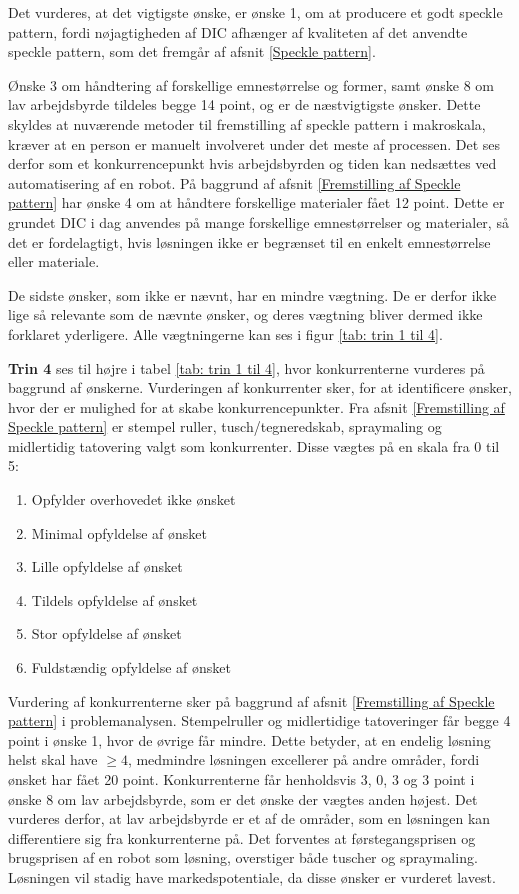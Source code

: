 Det vurderes, at det vigtigste ønske, er ønske 1, om at producere et godt speckle pattern, fordi nøjagtigheden af DIC afhænger af kvaliteten af det anvendte speckle pattern, som det fremgår af afsnit \ref{Speckle pattern}. 

Ønske 3 om håndtering af forskellige emnestørrelse og former, samt ønske 8 om lav arbejdsbyrde tildeles begge 14 point, og er de næstvigtigste ønsker. Dette skyldes at nuværende metoder til fremstilling af speckle pattern i makroskala, kræver at en person er manuelt involveret under det meste af processen. Det ses derfor som et konkurrencepunkt hvis arbejdsbyrden og tiden kan nedsættes ved automatisering af en robot. På baggrund af afsnit \ref{Fremstilling af Speckle pattern} har ønske 4 om at håndtere forskellige materialer fået 12 point. Dette er grundet DIC i dag anvendes på mange forskellige emnestørrelser og materialer, så det er fordelagtigt, hvis løsningen ikke er begrænset til en enkelt emnestørrelse eller materiale. 

De sidste ønsker, som ikke er nævnt, har en mindre vægtning. De er derfor ikke lige så relevante som de nævnte ønsker, og deres vægtning bliver dermed ikke forklaret yderligere. Alle vægtningerne kan ses i figur \ref{tab: trin 1 til 4}.


\textbf{Trin 4} ses til højre i tabel \ref{tab: trin 1 til 4}, hvor konkurrenterne vurderes på baggrund af ønskerne. Vurderingen af konkurrenter sker, for at identificere ønsker, hvor der er mulighed for at skabe konkurrencepunkter. Fra afsnit \ref{Fremstilling af Speckle pattern} er stempel ruller, tusch/tegneredskab, spraymaling og midlertidig tatovering valgt som konkurrenter. Disse vægtes på en skala fra 0 til 5: %


\newcommand{\myhash}{\raisebox{\depth}{\#}}
\begin{enumerate}[font=\bfseries]\addtocounter{enumi}{-1}
    \item Opfylder overhovedet ikke ønsket 
    \item Minimal opfyldelse af ønsket 
    \item Lille opfyldelse af ønsket 
    \item Tildels opfyldelse af ønsket 
    \item Stor opfyldelse af ønsket 
    \item Fuldstændig opfyldelse af ønsket 
\end{enumerate}


Vurdering af konkurrenterne sker på baggrund af afsnit \ref{Fremstilling af Speckle pattern} i problemanalysen. Stempelruller og midlertidige tatoveringer får begge 4 point i ønske 1, hvor de øvrige får mindre. Dette betyder, at en endelig løsning helst skal have $\geq 4$, medmindre løsningen excellerer på andre områder, fordi ønsket har fået 20 point. Konkurrenterne får henholdsvis 3, 0, 3 og 3 point i ønske 8 om lav arbejdsbyrde, som er det ønske der vægtes anden højest. Det vurderes derfor, at lav arbejdsbyrde er et af de områder, som en løsningen kan differentiere sig fra konkurrenterne på. Det forventes at førstegangsprisen og brugsprisen af en robot som løsning, overstiger både tuscher og spraymaling. Løsningen vil stadig have markedspotentiale, da disse ønsker er vurderet lavest. 

